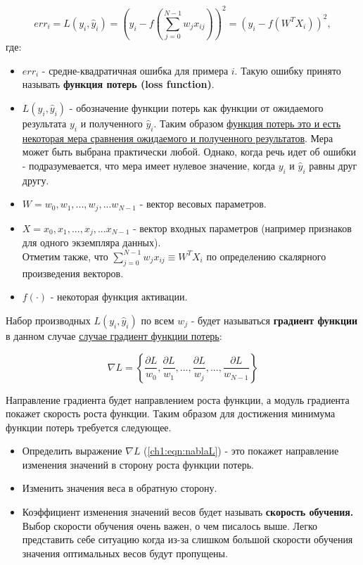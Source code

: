 \documentclass[12pt]{article}
\begin{document}
\begin{sloppypar}
\begin{equation}
	\label{ch1:eqn:MSELoss_ch1}
	err_i = L(y_i,\hat y_i) = (y_i - f(\sum_{j=0}^{N-1}w_jx_{ij}))^2 = (y_i - f(W^TX_i))^2,
\end{equation}
где:
\begin{itemize}
    \item $err_i$ - средне-квадратичная ошибка для примера $i$. Такую ошибку принято называть \textbf{функция потерь (loss function)}.
    \item $L(y_i,\hat y_i)$ - обозначение функции потерь как функции от ожидаемого результата $y_i$ и полученного $\hat y_i$. Таким образом \uline{функция потерь это и есть некоторая мера сравнения ожидаемого и полученного результатов}. Мера может быть выбрана практически любой. Однако, когда речь идет об ошибки - подразумевается, что мера имеет нулевое значение, когда $y_i$ и $\hat y_i$  равны друг другу.
    \item $W = {w_0,w_1,...,w_j,...w_{N-1}}$ - вектор весовых параметров.
    \item $X = {x_0,x_1,...,x_j,...x_{N-1}}$ - вектор входных параметров (например признаков для одного экземпляра данных). \\ Отметим также, что $\sum_{j=0}^{N-1}w_jx_{ij} \equiv W^TX_i$ по определению скалярного произведения векторов.
    \item $f(\cdot)$ - некоторая функция активации.
\end{itemize}

 Набор производных $L(y_i,\hat y_i)$ по всем $w_j$ - будет называться \textbf{градиент функции} в данном случае
 \underline{случае градиент функции потерь}: 

 \begin{equation}
	\label{ch1:eqn:nablaL}
	 \nabla L = \left\{
	 \frac{\partial L}{w_0},
	 \frac{\partial L}{w_1},
	 ...,
	 \frac{\partial L}{w_j},
	 ...,
	 \frac{\partial L}{w_{N-1}}
	 \right\}
\end{equation}

 Направление градиента будет направлением роста функции, а модуль градиента покажет скорость роста функции. Таким образом для достижения минимума функции потерь требуется следующее.
 
 \begin{itemize}
 \item Определить выражение $\nabla L$ (\ref{ch1:eqn:nablaL}) - это покажет направление изменения значений в сторону роста функции потерь. 
  \item Изменить значения веса в обратную сторону. 
 \item Коэффициент изменения значений весов будет называть \textbf{скорость обучения.}  Выбор скорости обучения очень важен, о чем писалось выше. Легко представить себе ситуацию когда из-за слишком большой скорости обучения значения оптимальных весов будут пропущены.
\end{itemize}


\end{sloppypar}
\end{document}
